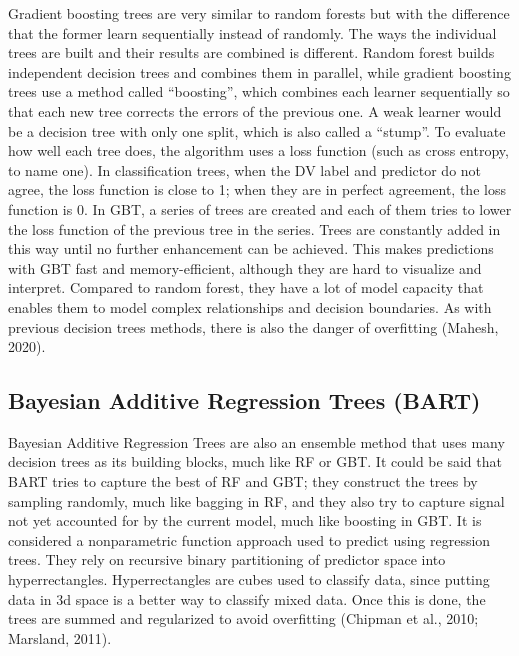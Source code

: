 \documentclass[
  jou]{apa6}
\begin{document}
Gradient boosting trees are very similar to random forests but with the difference that the former learn sequentially instead of randomly.
The ways the individual trees are built and their results are combined is different.
Random forest builds independent decision trees and combines them in parallel, while gradient boosting trees use a method called ``boosting'', which combines each learner sequentially so that each new tree corrects the errors of the previous one.
A weak learner would be a decision tree with only one split, which is also called a ``stump''.
To evaluate how well each tree does, the algorithm uses a loss function (such as cross entropy, to name one).
In classification trees, when the DV label and predictor do not agree, the loss function is close to 1; when they are in perfect agreement, the loss function is 0.
In GBT, a series of trees are created and each of them tries to lower the loss function of the previous tree in the series.
Trees are constantly added in this way until no further enhancement can be achieved.
This makes predictions with GBT fast and memory-efficient, although they are hard to visualize and interpret.
Compared to random forest, they have a lot of model capacity that enables them to model complex relationships and decision boundaries.
As with previous decision trees methods, there is also the danger of overfitting (Mahesh, 2020).

\hypertarget{bayesian-additive-regression-trees-bart}{%
\subsection{Bayesian Additive Regression Trees (BART)}\label{bayesian-additive-regression-trees-bart}}

Bayesian Additive Regression Trees are also an ensemble method that uses many decision trees as its building blocks, much like RF or GBT.
It could be said that BART tries to capture the best of RF and GBT; they construct the trees by sampling randomly, much like bagging in RF, and they also try to capture signal not yet accounted for by the current model, much like boosting in GBT.
It is considered a nonparametric function approach used to predict using regression trees.
They rely on recursive binary partitioning of predictor space into hyperrectangles.
Hyperrectangles are cubes used to classify data, since putting data in 3d space is a better way to classify mixed data.
Once this is done, the trees are summed and regularized to avoid overfitting (Chipman et al., 2010; Marsland, 2011).
\end{document}
